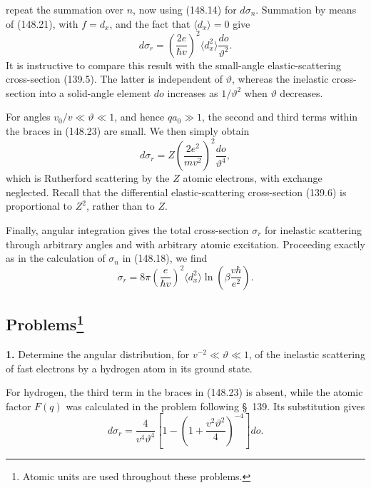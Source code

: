 repeat the summation over $n$, now using (148.14) for $d\sigma_n$.
Summation by means of (148.21), with $f=d_x$, and the fact that
$\langle d_x\rangle=0$ give
\begin{equation}
 d\sigma_r=\left(\frac{2e}{\hbar v}\right)^2\langle d_x^2\rangle\frac{do}{\vartheta^2}.
 \tag{148.24}
\end{equation}
It is instructive to compare this result with the small-angle elastic-scattering
cross-section (139.5).  The latter is independent of $\vartheta$, whereas the
inelastic cross-section into a solid-angle element $do$ increases as
$1/\vartheta^2$ when $\vartheta$ decreases.

For angles $v_0/v\ll\vartheta\ll1$, and hence $qa_0\gg1$, the second and
third terms within the braces in (148.23) are small.  We then simply obtain
\begin{equation}
 d\sigma_r=Z\left(\frac{2e^2}{mv^2}\right)^2\frac{do}{\vartheta^4},
 \tag{148.25}
\end{equation}
which is Rutherford scattering by the $Z$ atomic electrons, with exchange
neglected.  Recall that the differential elastic-scattering cross-section
(139.6) is proportional to $Z^2$, rather than to $Z$.

Finally, angular integration gives the total cross-section $\sigma_r$ for
inelastic scattering through arbitrary angles and with arbitrary atomic
excitation.  Proceeding exactly as in the calculation of $\sigma_n$ in
(148.18), we find
\begin{equation}
 \sigma_r=8\pi\left(\frac{e}{\hbar v}\right)^2\langle d_x^2\rangle
 \ln\left(\beta\frac{v\hbar}{e^2}\right).
 \tag{148.26}
\end{equation}

\subsection*{Problems\footnote{Atomic units are used throughout these problems.}}

\noindent\textbf{1.} Determine the angular distribution, for
$v^{-2}\ll\vartheta\ll1$, of the inelastic scattering of fast electrons by a
hydrogen atom in its ground state.

\SolutionHeading For hydrogen, the third term in the braces in (148.23) is
absent, while the atomic factor $F(q)$ was calculated in the problem following
\S~139.  Its substitution gives
\[
 d\sigma_r=\frac4{v^4\vartheta^4}\left[1-\left(1+\frac{v^2\vartheta^2}{4}\right)^{-4}\right]do.
\]

